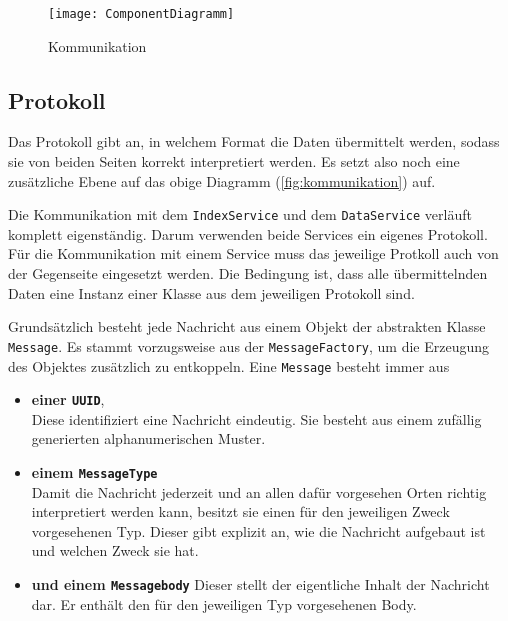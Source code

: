     \begin{figure}[H]
    \centering
    \texttt{[image: ComponentDiagramm]}
    \caption{Kommunikation}
    \label{fig:kommunikation}
    \end{figure}
    


\subsection{Protokoll}\label{section:protokoll}

Das Protokoll gibt an, in welchem Format die Daten übermittelt werden, sodass sie von beiden Seiten korrekt interpretiert werden. Es setzt also noch eine zusätzliche Ebene auf das obige Diagramm (\autoref{fig:kommunikation}) auf.



Die Kommunikation mit dem \texttt{IndexService} und dem \texttt{DataService} verläuft komplett eigenständig. Darum verwenden beide Services ein eigenes Protokoll. Für die Kommunikation mit einem Service muss das jeweilige Protkoll auch von der Gegenseite eingesetzt werden. Die Bedingung ist, dass alle übermittelnden Daten eine Instanz einer Klasse aus dem jeweiligen Protokoll sind.
    

Grundsätzlich besteht jede Nachricht aus einem Objekt der abstrakten Klasse \texttt{Mes\-sa\-ge}. Es stammt vorzugsweise aus der \texttt{MessageFactory}, um die Erzeugung des Objektes zusätzlich zu entkoppeln. Eine \texttt{Mes\-sa\-ge} besteht immer aus 

\begin{itemize}
    \item \textbf{einer \texttt{UUID}},\\
    Diese identifiziert eine Nachricht eindeutig. Sie besteht aus einem zufällig generierten alphanumerischen Muster.
    \item \textbf{einem \texttt{MessageType}}\\
    Damit die Nachricht jederzeit und an allen dafür vorgesehen Orten richtig interpretiert werden kann, besitzt sie einen für den jeweiligen Zweck vorgesehenen Typ. Dieser gibt explizit an, wie die Nachricht aufgebaut ist und welchen Zweck sie hat.
    \item \textbf{und einem \texttt{Messagebody}}
    Dieser stellt der eigentliche Inhalt der Nachricht dar. Er enthält den für den jeweiligen Typ vorgesehenen Body.
\end{itemize}

